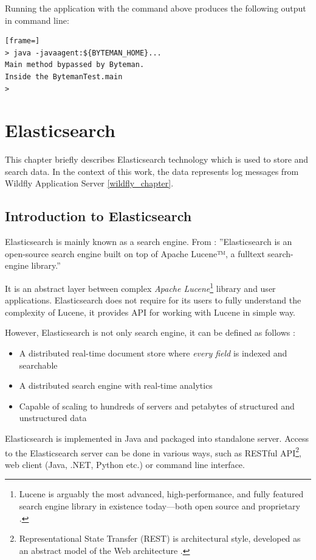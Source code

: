 \documentclass[12pt,oneside]{fithesis2}
\begin{document}
Running the application with the command above produces the following output in command line:
\begin{lstlisting}[frame=]
> java -javaagent:${BYTEMAN_HOME}...
Main method bypassed by Byteman.
Inside the BytemanTest.main
>
\end{lstlisting}

\chapter{Elasticsearch}
This chapter briefly describes Elasticsearch technology which is used to store and search data. In the context of this work, the data represents log messages from Wildfly Application Server \ref{wildfly_chapter}.

\section{Introduction to Elasticsearch}
Elasticsearch is mainly known as a search engine. From \cite{elasticsearch_defnitive_guide}: ''Elasticsearch is an open-source search engine built on top of Apache Lucene™, a fulltext search-engine library.''

It is an abstract layer between complex \textit{Apache Lucene}\footnote{Lucene is arguably the most advanced, high-performance, and fully featured search engine library in existence today—both open source and proprietary \cite{elasticsearch_defnitive_guide}.} library and user applications. Elasticsearch does not require for its users to fully understand the complexity of Lucene, it provides API for working with Lucene in simple way.

However, Elasticsearch is not only search engine, it can be defined as follows \cite{elasticsearch_defnitive_guide}:

\begin{itemize}
	\item A distributed real-time document store where \textit{every field} is indexed and searchable
	\item A distributed search engine with real-time analytics
	\item Capable of scaling to hundreds of servers and petabytes of structured and unstructured data
\end{itemize}

Elasticsearch is implemented in Java and packaged into standalone server. Access to the Elasticsearch server can be done in various ways, such as RESTful API\footnote{Representational State Transfer (REST) is architectural style, developed as an abstract model of the Web architecture \cite{rest}.}, web client (Java, .NET, Python etc.) or command line interface.
\end{document}
